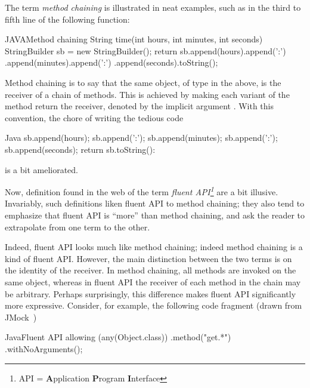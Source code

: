 The term \emph{method chaining} is illustrated in neat examples, such  
    as in the third to fifth line of the following \Java function: 
\begin{lCode}{JAVA}{Method chaining}
String time(int hours, int minutes, int seconds) { 
  StringBuilder sb  = new StringBuilder();
  return sb.append(hours).append(':')
          .append(minutes).append(':')
          .append(seconds).toString();
}
\end{lCode}
Method chaining is to say that the same object,  of type  in the above, 
   is the receiver of a chain of methods. 
This is achieved by making each variant of the method  return the receiver, denoted by the 
  implicit argument .
With this convention, the chore of writing the tedious code 
\begin{lcode}{Java}
  sb.append(hours);
  sb.append(':');
  sb.append(minutes);
  sb.append(':');
  sb.append(seconds);
  return sb.toString():
\end{lcode}
is a bit ameliorated. 
  
Now, definition found in the web of the term \emph{fluent API\footnote{API =
    \textbf Application \textbf Program \textbf Interface
}} are a bit illusive. 
Invariably, such definitions liken fluent API to method chaining; 
  they also tend to emphasize that fluent API is ``more'' than method
  chaining, and ask the reader to extrapolate from one term to the other.

Indeed, fluent API looks much like method chaining; indeed method chaining is a kind 
  of fluent API. 
However, the main distinction between the two terms is on the identity of the receiver.
In method chaining, all methods are invoked on the same object, whereas in fluent API
  the receiver of each method in the chain may be arbitrary. 
Perhaps surprisingly, this difference makes fluent API significantly more expressive.
Consider, for example, the following code fragment (drawn from JMock~\cite{Freeman:Pryce:06}) 
\begin{lCode}{Java}{Fluent API}
allowing (any(Object.class))
  .method("get.*")
  .withNoArguments();
\end{lCode}




